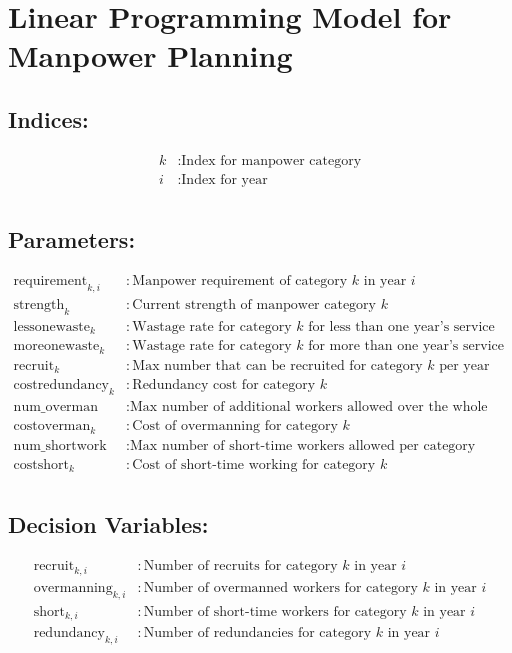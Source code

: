 \documentclass{article}
\begin{document}
\section*{Linear Programming Model for Manpower Planning}

\subsection*{Indices:}
\begin{align*}
k & : \text{Index for manpower category} \\
i & : \text{Index for year} \\
\end{align*}

\subsection*{Parameters:}
\begin{align*}
\text{requirement}_{k,i} & : \text{Manpower requirement of category } k \text{ in year } i \\
\text{strength}_k & : \text{Current strength of manpower category } k \\
\text{lessonewaste}_k & : \text{Wastage rate for category } k \text{ for less than one year's service} \\
\text{moreonewaste}_k & : \text{Wastage rate for category } k \text{ for more than one year's service} \\
\text{recruit}_k & : \text{Max number that can be recruited for category } k \text{ per year} \\
\text{costredundancy}_k & : \text{Redundancy cost for category } k \\
\text{num\_overman} & : \text{Max number of additional workers allowed over the whole company} \\
\text{costoverman}_k & : \text{Cost of overmanning for category } k \\
\text{num\_shortwork} & : \text{Max number of short-time workers allowed per category} \\
\text{costshort}_k & : \text{Cost of short-time working for category } k \\
\end{align*}

\subsection*{Decision Variables:}
\begin{align*}
\text{recruit}_{k,i} & : \text{Number of recruits for category } k \text{ in year } i \\
\text{overmanning}_{k,i} & : \text{Number of overmanned workers for category } k \text{ in year } i \\
\text{short}_{k,i} & : \text{Number of short-time workers for category } k \text{ in year } i \\
\text{redundancy}_{k,i} & : \text{Number of redundancies for category } k \text{ in year } i \\
\end{align*}
\end{document}
